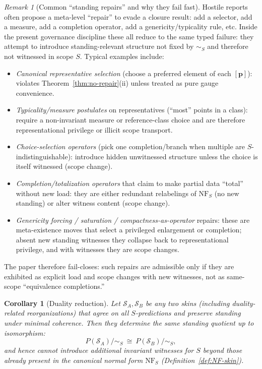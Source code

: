 \documentclass[11pt]{article}
\newtheorem{corollary}[definition]{Corollary}
\theoremstyle{remark}
\newtheorem{remark}[definition]{Remark}
\newcommand{\Skin}{\mathcal{S}}
\begin{document}
\begin{remark}[Common ``standing repairs'' and why they fail fast]\label{rem:repair-catalog}
Hostile reports often propose a meta-level ``repair'' to evade a closure result: add a selector, add a measure,
add a completion operator, add a genericity/typicality rule, etc.
Inside the present governance discipline these all reduce to the same typed failure:
they attempt to introduce standing-relevant structure not fixed by $\sim_S$ and therefore not witnessed in scope $S$.
Typical examples include:
\begin{itemize}[leftmargin=2.2em]
\item \emph{Canonical representative selection} (choose a preferred element of each $[\mathbf{p}]$): violates
Theorem~\ref{thm:no-repair}(ii) unless treated as pure gauge convenience.
\item \emph{Typicality/measure postulates} on representatives (``most'' points in a class): require a non-invariant
measure or reference-class choice and are therefore representational privilege or illicit scope transport.
\item \emph{Choice-selection operators} (pick one completion/branch when multiple are $S$-indistinguishable):
introduce hidden unwitnessed structure unless the choice is itself witnessed (scope change).
\item \emph{Completion/totalization operators} that claim to make partial data ``total'' without new load:
they are either redundant relabelings of $\mathrm{NF}_S$ (no new standing) or alter witness content (scope change).
\item \emph{Genericity forcing / saturation / compactness-as-operator} repairs: these are meta-existence moves that
select a privileged enlargement or completion; absent new standing witnesses they collapse back to representational
privilege, and with witnesses they are scope changes.
\end{itemize}
The paper therefore fail-closes: such repairs are admissible only if they are exhibited as explicit load and scope
changes with new witnesses, not as same-scope ``equivalence completions.''
\end{remark}




\begin{corollary}[Duality reduction]\label{cor:duality-reduction}
Let $\Skin_A,\Skin_B$ be any two skins (including duality-related reorganizations) that agree on all
$S$-predictions and preserve standing under minimal coherence.
Then they determine the same standing quotient up to isomorphism:
\[
P(\Skin_A)/\!\sim_S\ \cong\ P(\Skin_B)/\!\sim_S,
\]
and hence cannot introduce additional invariant witnesses for $S$ beyond those already present in the
canonical normal form $\mathrm{NF}_S$ (Definition~\ref{def:NF-skin}).
\end{corollary}
\end{document}
